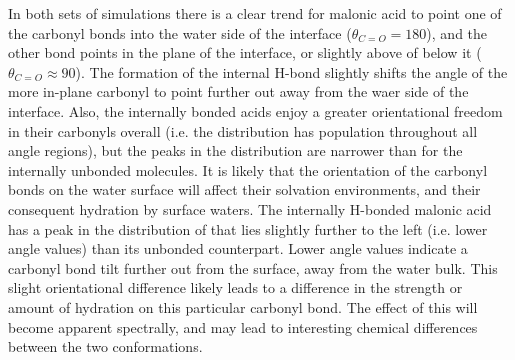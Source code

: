 In both sets of simulations there is a clear trend for malonic acid to point one of the carbonyl bonds into the water side of the interface ($\theta_{C=O}=180$\degr), and the other bond points in the plane of the interface, or slightly above of below it ($\theta_{C=O} \approx 90$\degr). The formation of the internal H-bond slightly shifts the angle of the more in-plane carbonyl to point further out away from the waer side of the interface. Also, the internally bonded acids enjoy a greater orientational freedom in their carbonyls overall (i.e. the distribution has population throughout all angle regions), but the peaks in the distribution are narrower than for the internally unbonded molecules. It is likely that the orientation of the carbonyl bonds on the water surface will affect their solvation environments, and their consequent hydration by surface waters. The internally H-bonded malonic acid has a peak in the distribution of \thetacarb that lies slightly further to the left (i.e. lower angle values) than its unbonded counterpart. Lower angle values indicate a carbonyl bond tilt further out from the surface, away from the water bulk. This slight orientational difference likely leads to a difference in the strength or amount of hydration on this particular carbonyl bond. The effect of this will become apparent spectrally, and may lead to interesting chemical differences between the two conformations.
